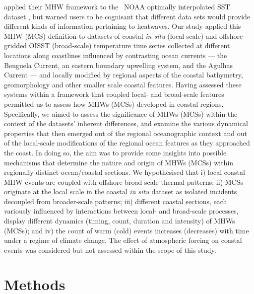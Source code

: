 \documentclass[a4paper,10pt,review]{elsarticle}
\begin{document}
\citet{Hobday2016} applied their MHW framework to the \degree~NOAA optimally interpolated SST dataset \citep[hereafter referred to as OISST;][]{Reynolds2007}, but warned users to be cognisant that different data sets would provide different kinds of information pertaining to heatwaves. Our study applied this MHW (MCS) definition to datasets of coastal \emph{in situ} (local-scale) and offshore gridded OISST (broad-scale) temperature time series collected at different locations along coastlines influenced by contrasting ocean currents --- the Benguela Current, an eastern boundary upwelling system, and the Agulhas Current --- and locally modified by regional aspects of the coastal bathymetry, geomorphology and other smaller scale coastal features. Having assessed these systems within a framework that coupled local- and broad-scale features permitted us to assess how MHWs (MCSs) developed in coastal regions. Specifically, we aimed to assess the significance of MHWs (MCSs) within the context of the datasets’ inherent differences, and examine the various dynamical properties that then emerged out of the regional oceanographic context and out of the local-scale modifications of the regional ocean features as they approached the coast. In doing so, the aim was to provide some insights into possible mechanisms that determine the nature and origin of MHWs (MCSs) within regionally distinct ocean/coastal sections. We hypothesised that i) local coastal MHW events are coupled with offshore broad-scale thermal patterns; ii) MCSs originate at the local scale in the coastal \emph{in situ} dataset as isolated incidents decoupled from broader-scale patterns; iii) different coastal sections, each variously influenced by interactions between local- and broad-scale processes, display different dynamics (timing, count, duration and intensity) of MHWs (MCSs); and iv) the count of warm (cold) events increases (decreases) with time under a regime of climate change. The effect of atmospheric forcing on coastal events was considered but not assessed within the scope of this study.

\section{Methods}
\end{document}
